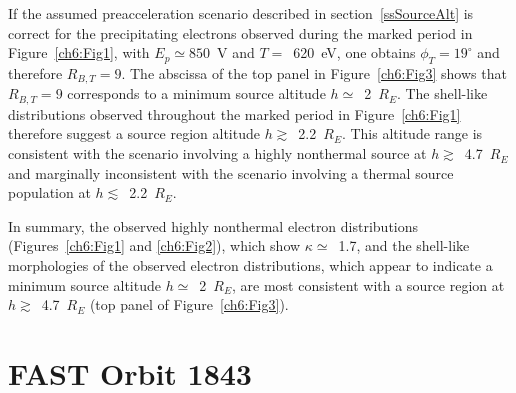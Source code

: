  If the assumed preacceleration scenario described in section~\ref{ssSourceAlt}
  is correct for the precipitating electrons observed during the marked period
  in Figure~\ref{ch6:Fig1}, with $E_p \simeq 850$~V and $T =$~620~eV, one
  obtains $\phi_T = 19^\circ$ and therefore $R_{B,T} = 9$. The abscissa of the
  top panel in Figure~\ref{ch6:Fig3} shows that $R_{B,T} = 9$ corresponds to a
  minimum source altitude $h \simeq$~2~$R_E$. The shell-like distributions
  observed throughout the marked period in Figure~\ref{ch6:Fig1} therefore
  suggest a source region altitude $h \gtrsim$~2.2~$R_E$. This altitude range is
  consistent with the scenario involving a highly nonthermal source at
  $h \gtrsim$~4.7~$R_E$ and marginally inconsistent with the scenario involving
  a thermal source population at $h \lesssim$~2.2~$R_E$.

  In summary, the observed highly nonthermal electron distributions
  (Figures~\ref{ch6:Fig1} and \ref{ch6:Fig2}), which show $\kappa \simeq$~1.7,
  and the shell-like morphologies of the observed electron distributions, which
  appear to indicate a minimum source altitude $h \simeq$~2~$R_E$, are most
  consistent with a source region at $h \gtrsim$~4.7~$R_E$ (top panel of
  Figure~\ref{ch6:Fig3}).





  
  \section{FAST Orbit 1843}


